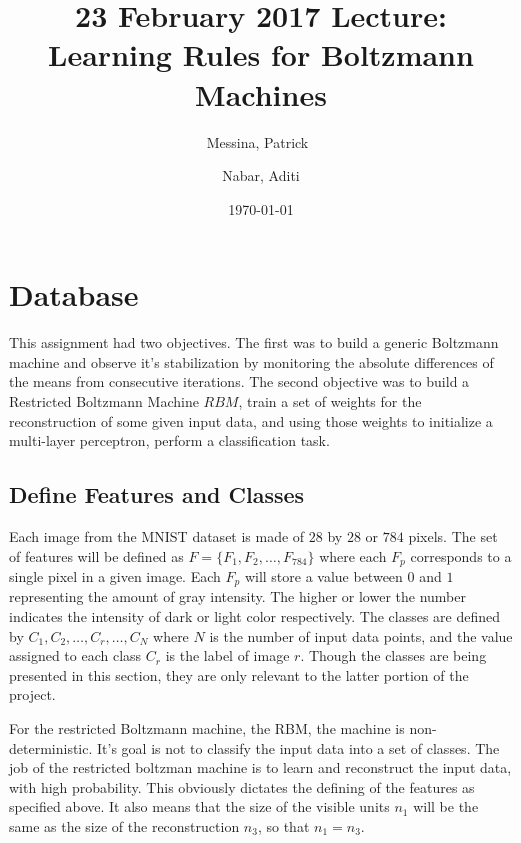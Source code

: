 \documentclass[11pt]{amsart}
\theoremstyle{remark}
\theoremstyle{remark}
\numberwithin{equation}{section}
\begin{document}
\title{23 February 2017 Lecture: Learning Rules for Boltzmann Machines}
\author{Messina, Patrick\ 
	\and
	 Nabar, Aditi}

\date{\today}

\maketitle


\section{Database}

	This assignment had two objectives. The first was to build a generic
	Boltzmann machine and observe it's stabilization by monitoring the absolute 
	differences of the means from consecutive iterations. The second objective
	was to build a Restricted Boltzmann Machine $RBM$, train a set of weights
	for the reconstruction of some given input data, and using those weights to 
	initialize a multi-layer perceptron, perform a classification task. 

  \subsection{Define Features and Classes}
    Each image from the MNIST dataset is made of $28$ by $28$ or $784$
    pixels.  The set of features will be defined as $F = \{ F_1, F_2, \dots,
    F_{784} \}$ where each $F_p$ corresponds to a single pixel in a given image. 
    Each $F_p$ will store a value between $0$ and $1$ representing the amount 
    of gray intensity.  The higher or lower the number indicates the intensity of 
    dark or light color respectively.  The classes are defined by $C_1, C_2,\dots, 
    C_r, \dots, C_N$ where
    $N$ is the number of input data points, and the value assigned to
    each class $C_r$ is the label of image $r$. Though the classes are being 
    presented in this section, they are only relevant to the latter portion of the project.
    
    For the restricted Boltzmann machine, the RBM, the machine is non-deterministic. 
    It's goal is not to classify the input data into a set of classes. The job of the 
    restricted boltzman machine is to learn and reconstruct the input data, with high 
    probability. This obviously dictates the defining of the features as specified above.
    It also means that the size of the visible units $n_1$ will be the same as the 
    size of the reconstruction $n_3$, so that $n_1 = n_3$. 
	
\end{document}
